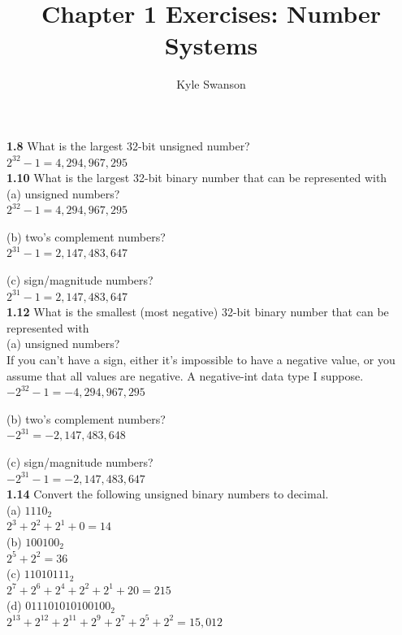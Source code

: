 \documentclass[12pt,a4paper]{report}
\author{Kyle Swanson}
\title{Chapter 1 Exercises: Number Systems}
\begin{document}
\maketitle

\begin{normalsize}



\textbf{1.8} What is the largest 32-bit unsigned number?\\
$ 2^{32}-1 = 4,294,967,295$ \\

\textbf{1.10} What is the largest 32-bit binary number that can be represented with\\
(a) unsigned numbers?\\
$ 2^{32}-1 = 4,294,967,295 $

(b) two's complement numbers?\\
$ 2^{31}-1 = 2,147,483,647 $

(c) sign/magnitude numbers?\\
$ 2^{31}-1 = 2,147,483,647 $ \\

\textbf{1.12} What is the smallest (most negative) 32-bit binary number that can be represented with\\
(a) unsigned numbers?\\
If you can't have a sign, either it's impossible to have a negative value, or you assume that all values are negative. A negative-int data type I suppose.
$ -2^{32}-1 = -4,294,967,295 $

(b) two's complement numbers?\\
$ -2^{31} = -2,147,483,648 $

(c) sign/magnitude numbers?\\
$ -2^{31}-1 = -2,147,483,647 $ \\

\textbf{1.14} Convert the following unsigned binary numbers to decimal.\\
(a) $ 1110_{2} $ \\
$ 2^{3} + 2^{2} + 2^{1} + 0 = 14 $ \\
(b) $ 10 0100_{2} $ \\
$ 2^{5} + 2^{2} = 36 $ \\
(c) $ 1101 0111_{2} $ \\
$ 2^{7} + 2^{6} + 2^{4} + 2^{2} + 2^{1} + 2{0} = 215 $ \\
(d) $ 011 1010 1010 0100_{2} $ \\
$ 2^{13} + 2^{12} + 2^{11} + 2^{9} + 2^{7} + 2^{5} + 2^{2} = 15,012 $ \\


\end{normalsize}
\end{document}
